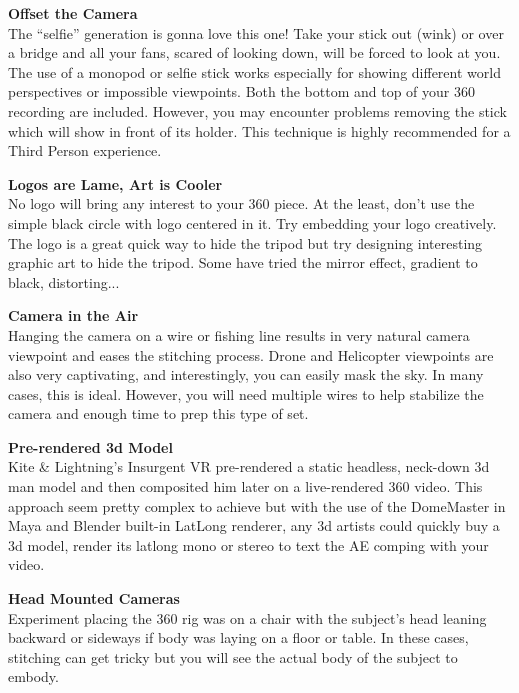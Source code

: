 \begin{fullwidth}

{\bfseries Offset the Camera}
\\
The “selfie” generation is gonna love this one! Take your stick out (wink) or over a bridge and all your fans, scared of looking down, will be forced to look at you. The use of a monopod or selfie stick works especially for showing different world perspectives or impossible viewpoints. Both the bottom and top of your 360 recording are included. However, you may encounter problems removing the stick which will show in front of its holder. This technique is highly recommended for a Third Person experience.


{\bfseries Logos are Lame, Art is Cooler}
\\
No logo will bring any interest to your 360 piece. At the least, don’t use the simple black circle with logo centered in it. Try embedding your logo creatively. The logo is a great quick way to hide the tripod but try designing interesting graphic art to hide the tripod. Some have tried the mirror effect, gradient to black, distorting... 

\clearpage
{\bfseries Camera in the Air}
\\
Hanging the camera on a wire or fishing line results in very natural camera viewpoint and eases the stitching process. Drone and Helicopter viewpoints are also very captivating, and interestingly, you can easily mask the sky. In many cases, this is ideal. However, you will need multiple wires to help stabilize the camera and enough time to prep this type of set.


{\bfseries Pre-rendered 3d Model}
\\
Kite & Lightning’s Insurgent VR pre-rendered a static headless, neck-down 3d man model and then composited him later on a live-rendered 360 video. This approach seem pretty complex to achieve but with the use of the DomeMaster in Maya and Blender built-in LatLong renderer, any 3d artists could quickly buy a 3d model, render its latlong mono or stereo to text the AE comping with your video. 


{\bfseries Head Mounted Cameras}
\\
Experiment placing the 360 rig was on a chair with the subject’s head leaning backward or sideways if body was laying on a floor or table. In these cases, stitching can get tricky but you will see the actual body of the subject to embody.


\end{fullwidth}

